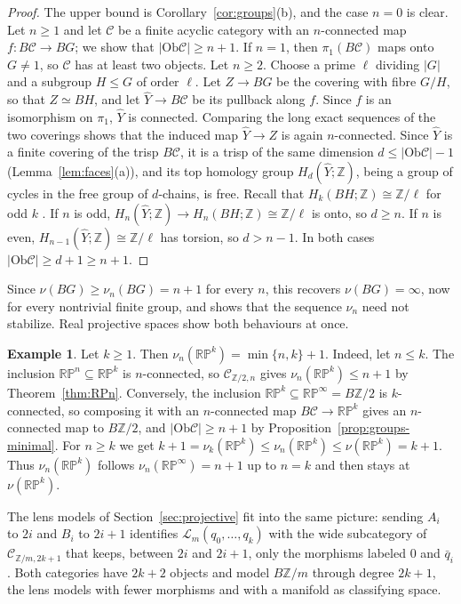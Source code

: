\documentclass[12pt]{amsart}
\theoremstyle{definition}
\newtheorem{example}[teo]{Example}
\theoremstyle{remark}
\newcommand{\CC}{\mathcal{C}}
\newcommand{\co}{\colon}
\newcommand{\Ob}{\mathrm{Ob}}
\newcommand{\Z}{\mathbb{Z}}
\newcommand{\RP}{\mathbb{RP}}
\begin{document}
\begin{proof}
The upper bound is Corollary~\ref{cor:groups}(b), and the case $n=0$ is clear. Let $n\ge1$ and let $\CC$ be a finite acyclic category with an $n$-connected map $f\co B\CC\to BG$; we show that $|\Ob\CC|\ge n+1$. If $n=1$, then $\pi_1(B\CC)$ maps onto $G\neq1$, so $\CC$ has at least two objects. Let $n\ge2$. Choose a prime $\ell$ dividing $|G|$ and a subgroup $H\le G$ of order $\ell$. Let $Z\to BG$ be the covering with fibre $G/H$, so that $Z\simeq BH$, and let $\widehat Y\to B\CC$ be its pullback along $f$. Since $f$ is an isomorphism on $\pi_1$, $\widehat Y$ is connected. Comparing the long exact sequences of the two coverings shows that the induced map $\widehat Y\to Z$ is again $n$-connected. Since $\widehat Y$ is a finite covering of the trisp $B\CC$, it is a trisp of the same dimension $d\le|\Ob\CC|-1$ (Lemma~\ref{lem:faces}(a)), and its top homology group $H_d(\widehat Y;\Z)$, being a group of cycles in the free group of $d$-chains, is free. Recall that $H_k(BH;\Z)\cong\Z/\ell$ for odd $k$ \cite{Hatcher2002}. If $n$ is odd, $H_n(\widehat Y;\Z)\to H_n(BH;\Z)\cong\Z/\ell$ is onto, so $d\ge n$. If $n$ is even, $H_{n-1}(\widehat Y;\Z)\cong\Z/\ell$ has torsion, so $d>n-1$. In both cases $|\Ob\CC|\ge d+1\ge n+1$.
\end{proof}

Since $\nu(BG)\ge\nu_n(BG)=n+1$ for every $n$, this recovers $\nu(BG)=\infty$, now for every nontrivial finite group, and shows that the sequence $\nu_n$ need not stabilize. Real projective spaces show both behaviours at once.

\begin{example}\label{ex:nu-n-RP}
Let $k\ge1$. Then $\nu_n(\RP^k)=\min\{n,k\}+1$. Indeed, let $n\le k$. The inclusion $\RP^n\subseteq\RP^k$ is $n$-connected, so $\CC_{\Z/2,n}$ gives $\nu_n(\RP^k)\le n+1$ by Theorem~\ref{thm:RPn}. Conversely, the inclusion $\RP^k\subseteq\RP^\infty=B\Z/2$ is $k$-connected, so composing it with an $n$-connected map $B\CC\to\RP^k$ gives an $n$-connected map to $B\Z/2$, and $|\Ob\CC|\ge n+1$ by Proposition~\ref{prop:groups-minimal}. For $n\ge k$ we get $k+1=\nu_k(\RP^k)\le\nu_n(\RP^k)\le\nu(\RP^k)=k+1$. Thus $\nu_n(\RP^k)$ follows $\nu_n(\RP^\infty)=n+1$ up to $n=k$ and then stays at $\nu(\RP^k)$.
\end{example}

The lens models of Section~\ref{sec:projective} fit into the same picture: sending $A_i$ to $2i$ and $B_i$ to $2i+1$ identifies $\mathcal L_m(q_0,\dots,q_k)$ with the wide subcategory of $\CC_{\Z/m,2k+1}$ that keeps, between $2i$ and $2i+1$, only the morphisms labeled $0$ and $\bar q_i$. Both categories have $2k+2$ objects and model $B\Z/m$ through degree $2k+1$, the lens models with fewer morphisms and with a manifold as classifying space.
\end{document}
